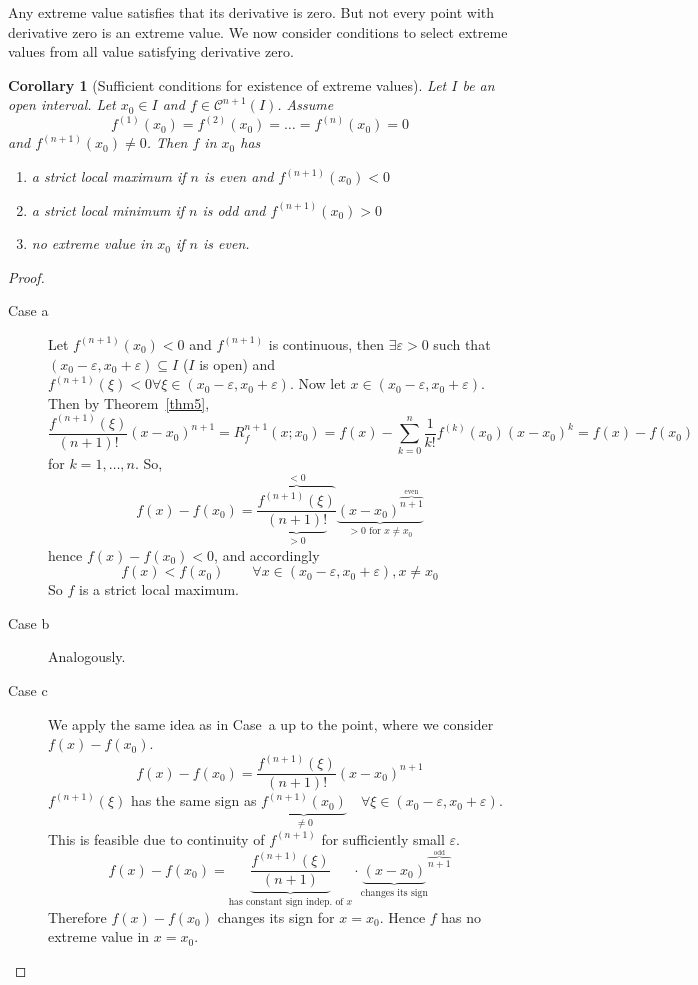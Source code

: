 \documentclass{article}
\newtheorem*{corollary}{Corollary}%
\begin{document}
Any extreme value satisfies that its derivative is zero. But not every point with derivative zero is an extreme value.
We now consider conditions to select extreme values from all value satisfying derivative zero.

\begin{corollary}[Sufficient conditions for existence of extreme values]
  Let $I$ be an open interval. Let $x_0 \in I$ and $f \in \mathcal C^{n+1}(I)$. Assume
  \[ f^{(1)}(x_0) = f^{(2)}(x_0) = \dots = f^{(n)}(x_0) = 0 \]
  and $f^{(n+1)}(x_0) \neq 0$. Then $f$ in $x_0$ has
  \begin{enumerate}
    \item a strict local maximum if $n$ is even and $f^{(n+1)}(x_0) < 0$
    \item a strict local minimum if $n$ is odd and $f^{(n+1)}(x_0) > 0$
    \item no extreme value in $x_0$ if $n$ is even.
  \end{enumerate}
\end{corollary}

\begin{proof}
  \begin{description}
    \item[Case a]
      Let $f^{(n+1)}(x_0) < 0$ and $f^{(n+1)}$ is continuous,
      then $\exists \varepsilon > 0$ such that $(x_0 - \varepsilon, x_0 + \varepsilon) \subseteq I$ ($I$ is open)
      and $f^{(n+1)}(\xi) < 0 \forall \xi \in (x_0 - \varepsilon, x_0 + \varepsilon)$.
      Now let $x \in (x_0 - \varepsilon, x_0 + \varepsilon)$.
      Then by Theorem~\ref{thm5},
      \[ \frac{f^{(n+1)}(\xi)}{(n+1)!} (x - x_0)^{n+1} = R_f^{n+1}(x; x_0) = f(x) - \sum_{k=0}^n \frac{1}{k!} f^{(k)}(x_0) (x - x_0)^k = f(x) - f(x_0) \]
      for $k = 1, \dots, n$. So,
      \[ f(x) - f(x_0) = \frac{\overbrace{f^{(n+1)}(\xi)}^{< 0}}{\underbrace{(n+1)!}_{> 0}} \underbrace{(x - x_0)^{\overbrace{n+1}^{\text{even}}}}_{> 0 \text{ for } x \neq x_0} \]
      hence $f(x) - f(x_0) < 0$, and accordingly
      \[ f(x) < f(x_0) \qquad \forall x \in (x_0 - \varepsilon, x_0 + \varepsilon), x \neq x_0 \]
      So $f$ is a strict local maximum.
    \item[Case b] Analogously.
    \item[Case c] We apply the same idea as in Case~a up to the point, where we consider $f(x) - f(x_0)$.
      \[ f(x) - f(x_0) = \frac{f^{(n+1)}(\xi)}{(n+1)!} (x - x_0)^{n+1} \]
      $f^{(n+1)}(\xi)$ has the same sign as $\underbrace{f^{(n+1)}(x_0)}_{\neq 0} \quad \forall \xi \in (x_0 - \varepsilon, x_0 + \varepsilon)$.
      This is feasible due to continuity of $f^{(n+1)}$ for sufficiently small $\varepsilon$.
      \[
        f(x) - f(x_0)
        = \underbrace{\frac{f^{(n+1)}(\xi)}{(n+1)}}_{\text{has constant sign indep. of } x} \cdot {\underbrace{(x - x_0)}_{\text{changes its sign}}}^{\overbrace{n+1}^{\text{odd}}}
      \]
      Therefore $f(x) - f(x_0)$ changes its sign for $x = x_0$. Hence $f$ has no extreme value in $x = x_0$.
  \end{description}
\end{proof}
\end{document}
